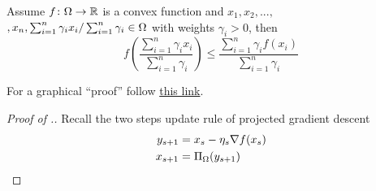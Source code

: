 \begin{proposition}
Assume $f\colon\Omega\to\mathbb{R}$ is a convex function and $x_{1}, x_{2}, ...,$\\
$,x_{n},\sum_{i=1}^{n}\gamma_{i}x_{i}/\sum_{i=1}^{n}\gamma_{i}\in\Omega$ with weights $\gamma_{i} > 0$, then
\[
f\left(\frac{\sum_{i=1}^{n}\gamma_{i}x_{i}}{\sum_{i=1}^{n}\gamma_{i}}\right) \leq \frac{\sum_{i=1}^{n}\gamma_{i}f(x_{i})}{\sum_{i=1}^{n}\gamma_{i}}
\]
\end{proposition}

For a graphical  ``proof'' follow
\href{http://mark.reid.name/blog/behold-jensens-inequality.html}{this link}.

\begin{proof}[Proof of .] 
Recall the two steps update rule of projected gradient descent
\begin{align*}
y_{s+1} &= x_{s} - \eta_{s}\nabla f(x_{s})\\
x_{s+1} &= \Pi_{\Omega}(y_{s+1})
\end{align*}


\end{proof}
